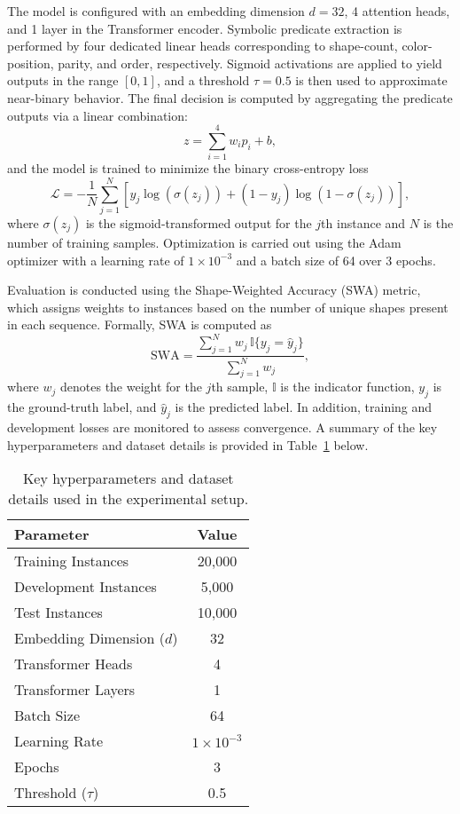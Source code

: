 \documentclass{article}
\begin{document}
The model is configured with an embedding dimension \(d = 32\), 4 attention heads, and 1 layer in the Transformer encoder. Symbolic predicate extraction is performed by four dedicated linear heads corresponding to shape-count, color-position, parity, and order, respectively. Sigmoid activations are applied to yield outputs in the range \([0, 1]\), and a threshold \(\tau = 0.5\) is then used to approximate near-binary behavior. The final decision is computed by aggregating the predicate outputs via a linear combination:
\[
z = \sum_{i=1}^{4} w_i p_i + b,
\]
and the model is trained to minimize the binary cross-entropy loss
\[
\mathcal{L} = -\frac{1}{N} \sum_{j=1}^{N} \left[ y_j \log\left(\sigma(z_j)\right) + (1 - y_j) \log\left(1 - \sigma(z_j)\right) \right],
\]
where \(\sigma(z_j)\) is the sigmoid-transformed output for the \(j\)th instance and \(N\) is the number of training samples. Optimization is carried out using the Adam optimizer with a learning rate of \(1\times10^{-3}\) and a batch size of 64 over 3 epochs.

Evaluation is conducted using the Shape-Weighted Accuracy (SWA) metric, which assigns weights to instances based on the number of unique shapes present in each sequence. Formally, SWA is computed as
\[
\text{SWA} = \frac{\sum_{j=1}^{N} w_j \,\mathbb{I}\{y_j = \widehat{y}_j\}}{\sum_{j=1}^{N} w_j},
\]
where \(w_j\) denotes the weight for the \(j\)th sample, \(\mathbb{I}\) is the indicator function, \(y_j\) is the ground-truth label, and \(\widehat{y}_j\) is the predicted label. In addition, training and development losses are monitored to assess convergence. A summary of the key hyperparameters and dataset details is provided in Table~\ref{tab:exp_hyperparams} below.

\begin{table}[h]
\centering
\begin{tabular}{lc}
\hline
\textbf{Parameter} & \textbf{Value} \\
\hline
Training Instances & 20,000 \\
Development Instances & 5,000 \\
Test Instances & 10,000 \\
Embedding Dimension (\(d\)) & 32 \\
Transformer Heads & 4 \\
Transformer Layers & 1 \\
Batch Size & 64 \\
Learning Rate & \(1\times10^{-3}\) \\
Epochs & 3 \\
Threshold (\(\tau\)) & 0.5 \\
\hline
\end{tabular}
\caption{Key hyperparameters and dataset details used in the experimental setup.}
\label{tab:exp_hyperparams}
\end{table}
\end{document}
